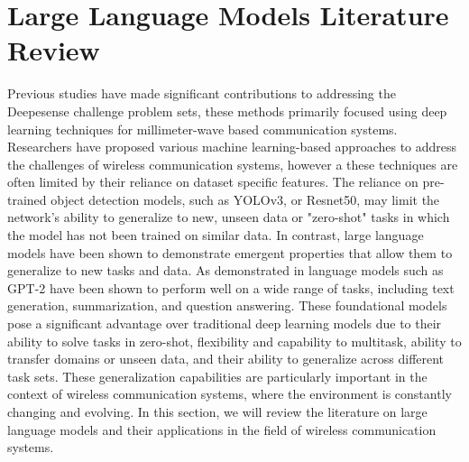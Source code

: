 \section{Large Language Models Literature Review}
Previous studies have made significant contributions to addressing the Deepesense challenge problem sets, these methods primarily focused using deep learning techniques for millimeter-wave based communication systems. Researchers have proposed various machine learning-based approaches to address the challenges of wireless communication systems, however a these techniques are often limited by their reliance on dataset specific features. The reliance on pre-trained object detection models, such as YOLOv3, or Resnet50, may limit the network's ability to generalize to new, unseen data or "zero-shot" tasks in which the model has not been trained on similar data. In contrast, large language models have been shown to demonstrate emergent properties that allow them to generalize to new tasks and data. As demonstrated in \cite{radford2019language} language models such as GPT-2 have been shown to perform well on a wide range of tasks, including text generation, summarization, and question answering. These foundational models pose a significant advantage over traditional deep learning models due to their ability to solve tasks in zero-shot, flexibility and capability to multitask, ability to transfer domains or unseen data, and their ability to generalize across different task sets. These generalization capabilities are particularly important in the context of wireless communication systems, where the environment is constantly changing and evolving. In this section, we will review the literature on large language models and their applications in the field of wireless communication systems.










